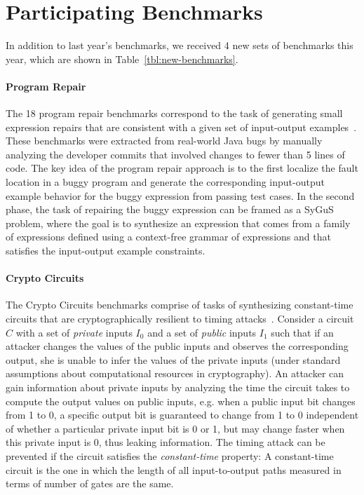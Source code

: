 \section{Participating Benchmarks}
\label{sec:benchs}

In addition to last year's benchmarks, we received 4 new sets of benchmarks this year, which are shown in Table~\ref{tbl:new-benchmarks}. 


\paragraph{Program Repair}
The 18 program repair benchmarks correspond to the task of generating small expression repairs that are consistent with a given set of input-output examples~\cite{repairbenchmarks}. These benchmarks were extracted from real-world Java bugs by manually analyzing the developer commits that involved changes to fewer than 5 lines of code. The key idea of the program repair approach is to the first localize the fault location in a buggy program and generate the corresponding input-output example behavior for the buggy expression from passing test cases. In the second phase, the task of repairing the buggy expression can be framed as a SyGuS problem, where the goal is to synthesize an expression that comes from a family of expressions defined using a context-free grammar of expressions and that satisfies the input-output example constraints.

\paragraph{Crypto Circuits}
The Crypto Circuits benchmarks comprise of tasks of synthesizing constant-time circuits that are cryptographically resilient to timing attacks~\cite{EldibWW16}. Consider a circuit $C$ with a set of \emph{private} inputs $I_0$ and a set of \emph{public} inputs $I_1$ such that if an attacker changes the values of
the public inputs and observes the corresponding output, she is unable to infer the values
of the private inputs (under standard assumptions about computational resources in cryptography). An attacker can gain information about private inputs by analyzing the time the circuit takes to compute the output values on public inputs, e.g. when a public input bit changes from 1 to 0, a specific output bit is guaranteed to
change from 1 to 0 independent of whether a particular private input bit is 0 or 1, but 
may change faster when this private input is 0, thus leaking information.
The timing attack can be prevented if the circuit satisfies the \emph{constant-time} property:
A constant-time circuit is the one in which the length of all input-to-output paths  measured in terms of number of gates
are the same.

